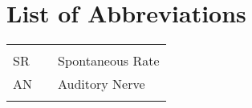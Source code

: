 
\tableofcontents
\cleardoublepage{}


\newpage
\listoffigures
\cleardoublepage{}

\chapter*{List of Abbreviations}
\begin{center}
  \begin{tabular}{lll}
    \hspace*{2em} & \hspace*{1in} & \hspace*{4.5in} \\
    SR    & \dotfill & Spontaneous Rate \\
    AN    & \dotfill & Auditory Nerve  \\
       & \dotfill &  \\
  \end{tabular}
\end{center}
\cleardoublepage{}


\newpage
\endofprelim{}